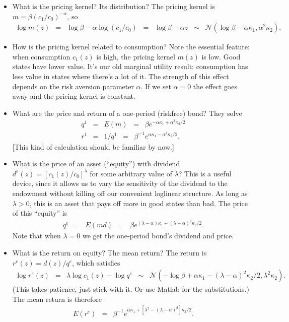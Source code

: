 \documentclass[11pt]{article}
\begin{document}
\begin{itemize}
\item What is the pricing kernel?  Its distribution?
The pricing kernel is $m = \beta (c_1/c_0)^{-\alpha}$, so
\begin{eqnarray*}
    \log m(z) &=& \log \beta - \alpha \log (c_1/c_0)
            \;\;=\;\; \log \beta - \alpha z 
            \;\;\sim \;\; \mathcal{N}(\log \beta - \alpha \kappa_1, \alpha^2 \kappa_2) .
\end{eqnarray*}


\item How is the pricing kernel related to consumption?
Note the essential feature:  when consumption $c_1(z)$ is high,
the pricing kernel $m(z)$ is low.
Good states have lower value.
It's our old marginal utility result:  consumption has less value in states where there's a lot of it.
The strength of this effect depends on the risk aversion parameter $\alpha$.
If we set $\alpha = 0$ the effect goes away and the pricing kernel is constant.

\item What are the price and return of a one-period (riskfree) bond?
They solve
\begin{eqnarray*}
    q^1 &=& E(m) \;\;=\;\; \beta e^{ - \alpha \kappa_1 + \alpha^2 \kappa_2/2 } \\
    r^1 &=& 1/q^1 \;\;=\;\; \beta^{-1} e^{\alpha \kappa_1 - \alpha^2 \kappa_2/2 } .
\end{eqnarray*}
[This kind of calculation should be familiar by now.]
\item What is the price of an asset (``equity'') with dividend
$d^e(z) = [c_1(z)/c_0]^\lambda$ for some
arbitrary value of $\lambda$?
This is a useful device, since it allows us to vary the sensitivity of the dividend
to the endowment without killing off our convenient loglinear structure.
As long as $\lambda > 0$, this is an asset that pays off more in good states than bad.
The price of this ``equity'' is
\begin{eqnarray*}
    q^e &=& E(md) \;\;=\;\; \beta e^{ (\lambda- \alpha) \kappa_1
    + (\lambda-\alpha)^2 \kappa_2/2 } .
\end{eqnarray*}
Note that when $\lambda = 0$ we get the one-period bond's dividend and price.
\item What is the return on equity?  The mean return?
The return is $r^e(z) = d(z)/q^e$, which satisfies
\begin{eqnarray*}
    \log r^e(z) &=& \lambda \log c_1(z) - \log q^e
            \;\;\sim \;\; \mathcal{N}
            (-\log \beta + \alpha \kappa_1 - (\lambda-\alpha)^2 \kappa_2/2, \lambda^2 \kappa_2) .
\end{eqnarray*}
(This takes patience, just stick with it.  Or use Matlab for the substitutions.)
The mean return is therefore
\begin{eqnarray*}
    E (r^e) &=& \beta^{-1} e^{\alpha \kappa_1 + [\lambda^2 - (\lambda-\alpha)^2] \kappa_2/2 } .
\end{eqnarray*}


\end{itemize}
\end{document}
